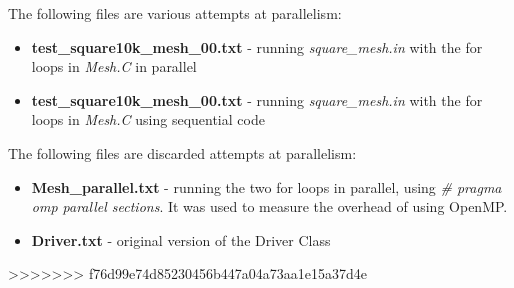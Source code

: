 \documentclass[11pt,journal]{IEEEtran}
\begin{document}
	The following files are various attempts at parallelism:
	\begin{itemize}
		\item \textbf{test\_square10k\_mesh\_00.txt} - running \emph{square\_mesh.in} with the for loops in \emph{Mesh.C} in parallel
		\item \textbf{test\_square10k\_mesh\_00.txt} - running \emph{square\_mesh.in} with the for loops in \emph{Mesh.C} using sequential code
	\end{itemize}

	The following files are discarded attempts at parallelism:
	\begin{itemize}
		\item \textbf{Mesh\_parallel.txt} - running the two for loops in parallel, using \emph{\# pragma omp parallel sections}. It was used to measure the overhead of using OpenMP.
		\item \textbf{Driver.txt} - original version of the Driver Class
	\end{itemize}



>>>>>>> f76d99e74d85230456b447a04a73aa1e15a37d4e
	
\end{document}
